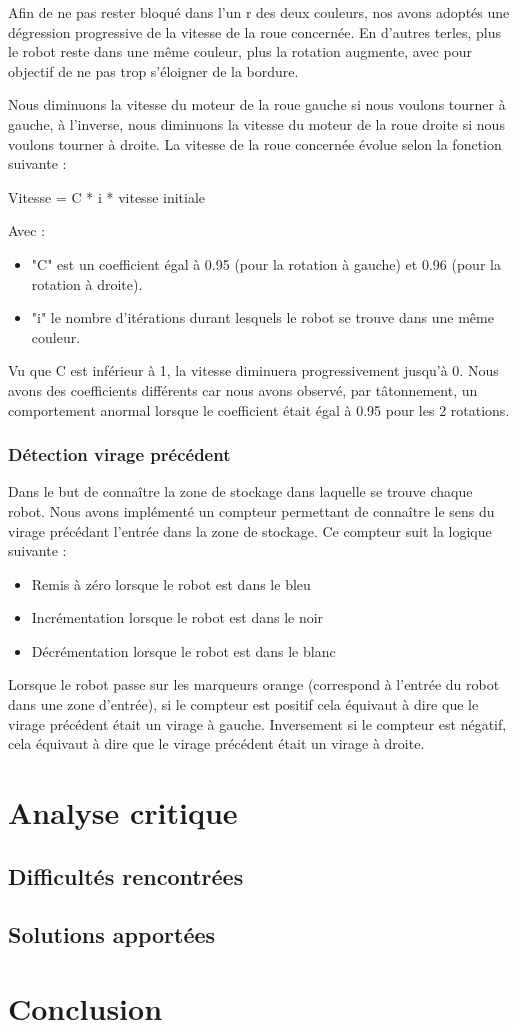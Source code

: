 \documentclass[french,a4paper,12pt]{report}
\begin{document}
Afin de ne pas rester bloqué dans l'un r des deux couleurs, nos avons adoptés une dégression progressive de la vitesse de la roue concernée. En d'autres terles, plus le robot reste dans une même couleur, plus la rotation augmente, avec pour objectif de ne pas trop s'éloigner de la bordure.

Nous diminuons la vitesse du moteur de la roue gauche si nous voulons tourner à gauche, à l’inverse, nous diminuons la vitesse du moteur de la roue droite si nous voulons tourner à droite. La vitesse de la roue concernée évolue selon la fonction suivante :

Vitesse = C * i * vitesse initiale

Avec :
\begin{itemize}
\item "C" est un coefficient égal à 0.95 (pour la rotation à gauche) et 0.96 (pour la rotation à droite).

\item "i" le nombre d’itérations durant lesquels le robot se trouve dans une même couleur.
\end{itemize}

Vu que C est inférieur à 1, la vitesse diminuera progressivement jusqu’à 0.
Nous avons des coefficients différents car nous avons observé, par tâtonnement, un comportement anormal lorsque le coefficient était égal à 0.95 pour les 2 rotations.

\section{Détection virage précédent}
Dans le but de connaître la zone de stockage dans laquelle se trouve chaque robot. Nous avons implémenté un compteur permettant de connaître le sens du virage précédant l’entrée dans la zone de stockage.
Ce compteur suit la logique suivante :
\begin{itemize}
\item Remis à zéro lorsque le robot est dans le bleu

\item Incrémentation lorsque le robot est dans le noir

\item Décrémentation lorsque le robot est dans le blanc
\end{itemize}

Lorsque le robot passe sur les marqueurs orange (correspond à l’entrée du robot dans une zone d’entrée), si le compteur est positif cela équivaut à dire que le virage précédent était un virage à gauche. Inversement si le compteur est négatif, cela équivaut à dire que le virage précédent était un virage à droite.

\part{Analyse critique}

\chapter{Difficultés rencontrées}

\chapter{Solutions apportées}

\part{Conclusion}
\end{document}
